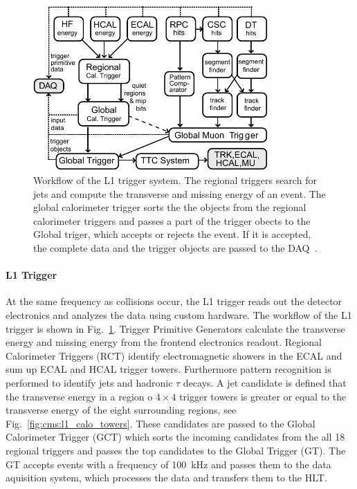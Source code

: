 \begin{figure}[htp]
    \centering
    \includegraphics[width=0.8\textwidth]{figures/cms_detector/cms_l1_trigger.pdf}\hfill
    \caption[The L1 Trigger of CMS]{Workflow of the L1 trigger system. The
        regional triggers search for jets and compute the transverse and missing
        energy of an event. The global calorimeter trigger sorts the the objects
        from the regional calorimeter triggers and passes a part of the trigger
        obects to the Global triger, which accepts or rejects the event. If it
        is accepted, the complete data and the trigger objects are passed to the
        DAQ~\cite{Sphicas:2002gg}.}
    \label{fig:cms:l1_trigger}
\end{figure}

\paragraph{L1 Trigger} 
At the same frequency as collisions occur, the L1 trigger reads out the detector
electronics and analyzes the data using custom hardware. The workflow of the L1
trigger is shown in Fig.~\ref{fig:cms:l1_trigger}. Trigger Primitive Generators
calculate the transverse energy and missing energy from the frontend electronics
readout. Regional Calorimeter Triggers (RCT) identify electromagnetic showers
in the ECAL and sum up ECAL and HCAL trigger towers. Furthermore pattern
recognition is performed to identify jets and hadronic $\tau$ decays. A jet
candidate is defined that the transverse energy in a region o $4\times4$ trigger
towers is greater or equal to the transverse energy of the eight surrounding
regions, see Fig.~\ref{fig:cms:l1_calo_towers}. These
candidates are passed to the Global Calorimeter Trigger (GCT) which sorts the
incoming candidates from the all 18 regional triggers and passes the top
candidates to the Global Trigger (GT). The GT accepts events with a frequency
of \SI{100}{\kilo\hertz} and passes them to the data aquisition system, which
processes the data and transfers them to the HLT.


